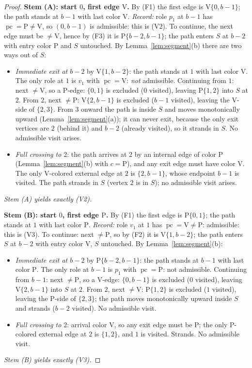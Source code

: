 \documentclass[11pt]{article}
\theoremstyle{definition}
\DeclareMathOperator{\pc}{pc}
\begin{document}
\begin{proof}
\medskip
\noindent\textbf{Stem (A): start $0$, first edge $\mathrm V$.}
By (F1) the first edge is $\mathrm V\{0, b-1\}$; the path stands at $b-1$ with last
color $\mathrm V$. \emph{Record:} role $p_1$ at $b-1$ has $\pc = \mathrm P \ne
\mathrm V$, so $(0, b-1)$ is admissible: this is (V2). To continue, the next edge
must be $\ne \mathrm V$, hence by (F3) it is $\mathrm P\{b-2,b-1\}$; the path enters
$S$ at $b-2$ with entry color $\mathrm P$ and $S$ untouched. By
Lemma~\ref{lem:segment}(b) there are two ways out of $S$:
\begin{itemize}
\item \emph{Immediate exit at $b-2$} by $\mathrm V\{1, b-2\}$: the path stands at
$1$ with last color $\mathrm V$. The only role at $1$ is $v_1$ with
$\pc = \mathrm V$: \emph{not} admissible. Continuing from $1$: next $\ne \mathrm V$,
so a P-edge: $\{0,1\}$ is excluded ($0$ visited), leaving $\mathrm P\{1,2\}$ into
$S$ at $2$. From $2$, next $\ne \mathrm P$: $\mathrm V\{2,b-1\}$ is excluded ($b-1$
visited), leaving the V-side of $\{2,3\}$. From $3$ onward the path is inside $S$
and moves monotonically upward (Lemma~\ref{lem:segment}(a)); it can never exit,
because the only exit vertices are $2$ (behind it) and $b-2$ (already visited), so
it strands in $S$. No admissible visit arises.
\item \emph{Full crossing to $2$}: the path arrives at $2$ by an internal edge of
color $\mathrm P$ (Lemma~\ref{lem:segment}(b) with $c = \mathrm P$), and any exit
edge must have color $\mathrm V$. The only V-colored external edge at $2$ is
$\{2, b-1\}$, whose endpoint $b-1$ is visited. The path strands in $S$ (vertex $2$
is in $S$); no admissible visit arises.
\end{itemize}
\emph{Stem (A) yields exactly (V2).}

\medskip
\noindent\textbf{Stem (B): start $0$, first edge $\mathrm P$.}
By (F1) the first edge is $\mathrm P\{0,1\}$; the path stands at $1$ with last color
$\mathrm P$. \emph{Record:} role $v_1$ at $1$ has $\pc = \mathrm V \ne \mathrm P$:
admissible: this is (V3). To continue: next $\ne \mathrm P$, so by (F2) it is
$\mathrm V\{1, b-2\}$; the path enters $S$ at $b-2$ with entry color $\mathrm V$,
$S$ untouched. By Lemma~\ref{lem:segment}(b):
\begin{itemize}
\item \emph{Immediate exit at $b-2$} by $\mathrm P\{b-2, b-1\}$: the path stands at
$b-1$ with last color $\mathrm P$. The only role at $b-1$ is $p_1$ with
$\pc = \mathrm P$: not admissible. Continuing from $b-1$: next $\ne \mathrm P$, so a
V-edge: $\{0,b-1\}$ is excluded ($0$ visited), leaving $\mathrm V\{2,b-1\}$ into $S$
at $2$. From $2$, next $\ne \mathrm V$: $\mathrm P\{1,2\}$ is excluded ($1$
visited), leaving the P-side of $\{2,3\}$; the path moves monotonically upward
inside $S$ and strands ($b-2$ visited). No admissible visit.
\item \emph{Full crossing to $2$}: arrival color $\mathrm V$, so any exit edge must
be $\mathrm P$; the only P-colored external edge at $2$ is $\{1,2\}$, and $1$ is
visited. Strands. No admissible visit.
\end{itemize}
\emph{Stem (B) yields exactly (V3).}


\end{proof}
\end{document}
